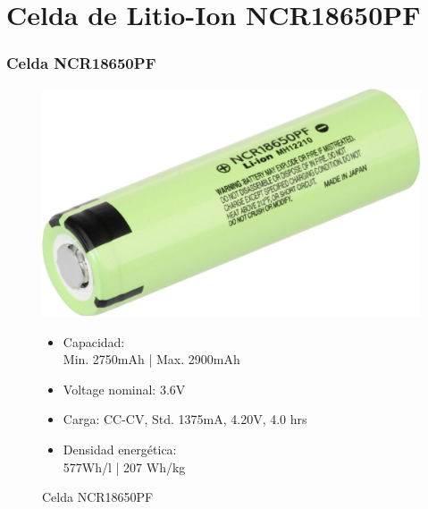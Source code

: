 \documentclass[10pt]{beamer}
\theoremstyle{remark}
\theoremstyle{definition}
\begin{document}
\section{Celda de Litio-Ion NCR18650PF}

\begin{frame}
  \frametitle{Celda NCR18650PF}

  \vspace{10pt}
  \begin{figure}[h!]
	\begin{minipage}{0.3\textwidth}
	  \centering
	  \includegraphics[width=0.45\linewidth]{images/18650}
	  \caption{Celda NCR18650PF}
	\end{minipage}
	\begin{minipage}{0.65\linewidth}
	  \begin{itemize}
		\item Capacidad: \\Min. 2750mAh | Max. 2900mAh
		\item Voltage nominal: 3.6V
		\item Carga: CC-CV, Std. 1375mA, 4.20V, 4.0 hrs
		\item Densidad energética: \\577Wh/l | 207 Wh/kg
	  \end{itemize}
	\end{minipage}
  \end{figure}

  \vspace{10pt}


\end{frame}
\end{document}
